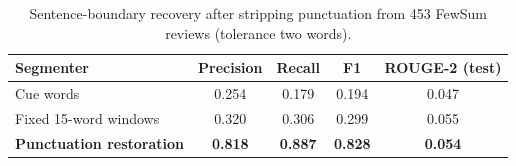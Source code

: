 \begin{table}[H]
\centering
\small
\caption{Sentence-boundary recovery after stripping punctuation from 453 FewSum reviews (tolerance two words).}
\label{tab:seg}
\begin{tabular}{lcccc}
\toprule
Segmenter & Precision & Recall & F1 & ROUGE-2 (test) \\
\midrule
Cue words & 0.254 & 0.179 & 0.194 & 0.047 \\
Fixed 15-word windows & 0.320 & 0.306 & 0.299 & 0.055 \\
\textbf{Punctuation restoration} & \textbf{0.818} & \textbf{0.887} & \textbf{0.828} & \textbf{0.054} \\
\bottomrule
\end{tabular}
\end{table}